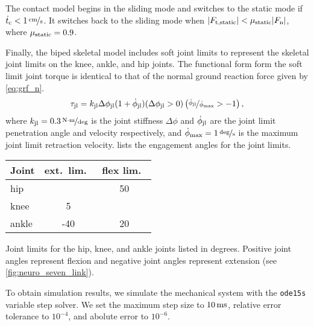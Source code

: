 The contact model begins in the sliding mode and switches to the static mode if
$\dot t_\tn{c} < \unitfrac[1]{cm}{s}$. It switches back to the sliding mode when
$| F_{\mathrm{t,static}} | < \mu_{\mathrm{static}} | F_{\mathrm{n}} |$, where $\mu_{\mathrm{static}} =
0.9$.

Finally, the biped skeletal model includes soft joint limits to represent
the skeletal joint limits on the knee, ankle, and hip joints. The functional
form form the soft limit joint torque is identical to that of the normal ground
reaction force given by \cref{eq:grf_n}.
\begin{align}
    \tau_{\mathrm{jl}} = k_{\mathrm{jl}} \Delta \phi_{\mathrm{jl}} (1 + \dot \phi_{\mathrm{jl}}) (\Delta
    \phi_{\mathrm{jl}}  > 0) \left(\nicefrac{\dot \phi_{\mathrm{jl}}}{\dot \phi_{\mathrm{max}}} > -1
    \right), 
    \label{eq:tau_joint_limit}
\end{align}
where $k_\tn{jl} = \unitfrac[0.3]{N \cdot m}{deg}$ is the joint stiffness $\Delta
\phi$ and $\dot \phi_{\mathrm{jl}}$ are the joint limit penetration angle and
velocity respectively, and $\dot \phi_\tn{max} = \unitfrac[1]{deg}{s}$ is the
maximum joint limit retraction velocity.  lists the
engagement angles for the joint limits.
\begin{margintable}[-0.65in]
  \centering
      \begin{tabular}{lcc}
        \toprule
        Joint & ext.\ lim.\ & flex lim.\ \\
        \midrule
        hip   &     & 50 \\
        knee  &   5 &    \\
        ankle & -40 & 20 \\
        \bottomrule
      \end{tabular}
  \caption{Joint limits for the hip, knee, and ankle joints listed in degrees.
  Positive joint angles represent flexion and negative joint angles represent
  extension (see \cref{fig:neuro_seven_link}).}\label{tab:joint_lim}
\end{margintable}

To obtain simulation results, we simulate the mechanical system with the
\verb+ode15s+
variable step solver. We set the maximum step size to $\unit[10]{ms}$, relative
error tolerance to $10^{-4}$, and abolute error to $10^{-6}$.

